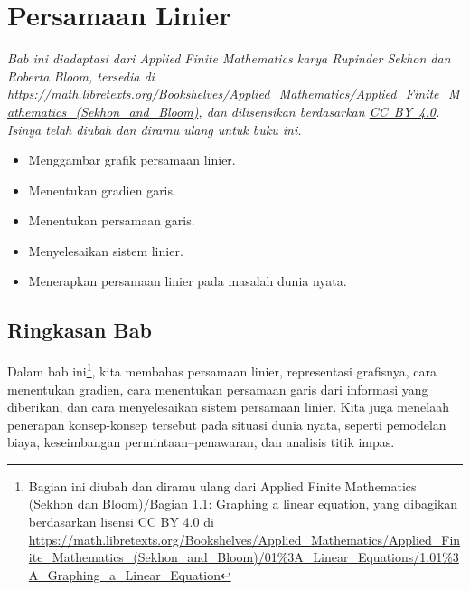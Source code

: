 
\chapter{Persamaan Linier}

\noindent\textit{Bab ini diadaptasi dari \emph{Applied Finite Mathematics} karya Rupinder Sekhon dan Roberta Bloom, tersedia di
\url{https://math.libretexts.org/Bookshelves/Applied_Mathematics/Applied_Finite_Mathematics_(Sekhon_and_Bloom)},
dan dilisensikan berdasarkan \href{https://creativecommons.org/licenses/by/4.0/}{CC~BY~4.0}.
Isinya telah diubah dan diramu ulang untuk buku ini.}

\medskip

\begin{outcome}
\begin{itemize}
\item Menggambar grafik persamaan linier.
\item Menentukan gradien garis.
\item Menentukan persamaan garis.
\item Menyelesaikan sistem linier.
\item Menerapkan persamaan linier pada masalah dunia nyata.
\end{itemize}
\end{outcome}

\section*{Ringkasan Bab}
Dalam bab ini\footnote{Bagian ini diubah dan diramu ulang dari
Applied Finite Mathematics (Sekhon dan Bloom)/Bagian 1.1: Graphing a linear equation, yang dibagikan berdasarkan lisensi CC BY 4.0 di
\url{https://math.libretexts.org/Bookshelves/Applied_Mathematics/Applied_Finite_Mathematics_(Sekhon_and_Bloom)/01\%3A_Linear_Equations/1.01\%3A_Graphing_a_Linear_Equation}
},
kita membahas persamaan linier, representasi grafisnya, cara menentukan gradien, cara menentukan persamaan garis dari informasi yang diberikan, dan cara menyelesaikan sistem persamaan linier. Kita juga menelaah penerapan konsep-konsep tersebut pada situasi dunia nyata, seperti pemodelan biaya, keseimbangan permintaan--penawaran, dan analisis titik impas.

